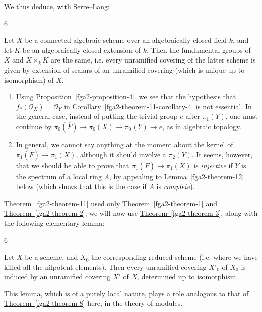   We thus deduce, with Serre–Lang:\begin{corollary}{6}\label{fga2-theorem-11-corollary-6}\skipsinglepar\par{}Let \(X\) be a connected algebraic scheme over an algebraically closed field \(k\), and let \(K\) be an algebraically closed extension of \(k\).
    Then the fundamental groups of \(X\) and \(X\times _kK\) are the same, i.e. every unramified covering of the latter scheme is given by extension of scalars of an unramified covering (which is unique up to isomorphism) of \(X\).\end{corollary}\begin{remarks}{}\label{fga2-8-remarks-i}\skipsinglepar\begin{enumerate}\item{}Using \hyperref[fga2-proposition-4]{Proposition~\ref*{fga2-proposition-4}}, we see that the hypothesis that \(f_*(\mathcal {O}_X)=\mathcal {O}_Y\) in \hyperref[fga2-theorem-11-corollary-4]{Corollary~\ref*{fga2-theorem-11-corollary-4}} is not essential.
      In the general case, instead of putting the trivial group \(e\) after \(\pi _1(Y)\), one must continue by \(\pi _0(\overline {F})\to \pi _0(X)\to \pi _0(Y)\to  e\),
      as in algebraic topology.

    \item{}In general, we cannot say anything at the moment about the kernel of \(\pi _1(\overline {F})\to \pi _1(X)\), although it should involve a \(\pi _2(Y)\).
      It seems, however, that we should be able to prove that \(\pi _1(\overline {F})\to \pi _1(X)\) is \emph{injective} if \(Y\) is the spectrum of a local ring \(A\), by appealing to \hyperref[fga2-theorem-12]{Lemma~\ref*{fga2-theorem-12}} below (which shows that this is the case if \(A\) is \emph{complete}).\end{enumerate}\end{remarks}\par{}\hyperref[fga2-theorem-11]{Theorem~\ref*{fga2-theorem-11}} used only \hyperref[fga2-theorem-1]{Theorem~\ref*{fga2-theorem-1}} and \hyperref[fga2-theorem-2]{Theorem~\ref*{fga2-theorem-2}};
  we will now use \hyperref[fga2-theorem-3]{Theorem~\ref*{fga2-theorem-3}}, along with the following elementary lemma:\begin{lemma}{6}\label{fga2-lemma-6}\skipsinglepar\par{}Let \(X\) be a scheme, and \(X_0\) the corresponding reduced scheme (i.e. where we have killed all the nilpotent elements).
    Then every unramified covering \(X'_0\) of \(X_0\) is induced by an unramified covering \(X'\) of \(X\), determined up to isomorphism.\end{lemma}\par{}This lemma, which is of a purely local nature, plays a role analogous to that of \hyperref[fga2-theorem-8]{Theorem~\ref*{fga2-theorem-8}} here, in the theory of modules.
